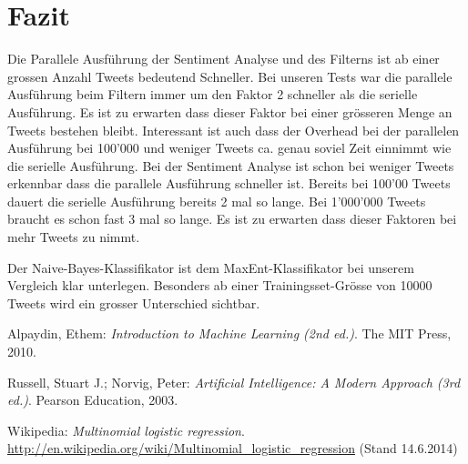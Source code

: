 \documentclass[12pt, oneside]{report}   	%
\begin{document}
\chapter{Fazit}
Die Parallele Ausführung der Sentiment Analyse und des Filterns ist ab einer grossen Anzahl Tweets bedeutend Schneller. Bei unseren Tests war die parallele Ausführung beim Filtern immer um den Faktor 2 schneller als die serielle Ausführung. Es ist zu erwarten dass dieser Faktor bei einer grösseren Menge an Tweets bestehen bleibt. Interessant ist auch dass der Overhead bei der parallelen Ausführung bei 100'000 und weniger Tweets ca. genau soviel Zeit einnimmt wie die serielle Ausführung. \newline{}
Bei der Sentiment Analyse ist schon bei weniger Tweets erkennbar dass die parallele Ausführung schneller ist. Bereits bei 100'00 Tweets dauert die serielle Ausführung bereits 2 mal so lange. Bei 1'000'000 Tweets braucht es schon fast 3 mal so lange. Es ist zu erwarten dass dieser Faktoren bei mehr Tweets zu nimmt.




Der Naive-Bayes-Klassifikator ist dem MaxEnt-Klassifikator bei unserem Vergleich klar unterlegen. 
Besonders ab einer Trainingsset-Grösse von 10000 Tweets wird ein grosser Unterschied sichtbar.

\clearpage
{}
{}


\linespread{1.2}\selectfont
\begin{thebibliography}{99}

 Alpaydin, Ethem: \emph{Introduction to Machine Learning (2nd ed.)}. The MIT Press, 2010.

 Russell, Stuart J.; Norvig, Peter: \emph{Artificial Intelligence: A Modern Approach (3rd ed.)}. Pearson Education, 2003.

 Wikipedia: \emph{Multinomial logistic regression}. \url{http://en.wikipedia.org/wiki/Multinomial_logistic_regression} (Stand 14.6.2014) 


\end{thebibliography}
\end{document}

